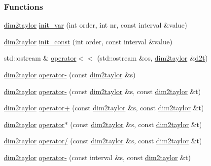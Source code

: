 \subsubsection*{\-Functions}
\begin{DoxyCompactItemize}
\item 
\hyperlink{classtaylor_1_1dim2taylor}{dim2taylor} \hyperlink{namespacetaylor_af8a36be36ab6bac844a69a3e14e2cc4d}{init\-\_\-var} (int order, int nr, const interval \&value)
\item 
\hyperlink{classtaylor_1_1dim2taylor}{dim2taylor} \hyperlink{namespacetaylor_a2d1667d3b5c500795eb06c586d75c309}{init\-\_\-const} (int order, const interval \&value)
\item 
std\-::ostream \& \hyperlink{namespacetaylor_a23cd9841df525cfac085fbeb62bf52a9}{operator$<$$<$} (std\-::ostream \&os, \hyperlink{classtaylor_1_1dim2taylor}{dim2taylor} \&\hyperlink{errorfunc_8hpp_ac90353a98ada0c22146b3ea9f0ac7a4d}{d2t})
\item 
\hyperlink{classtaylor_1_1dim2taylor}{dim2taylor} \hyperlink{namespacetaylor_a6e1382a183bbab0366f7d451aa1d34d3}{operator-\/} (const \hyperlink{classtaylor_1_1dim2taylor}{dim2taylor} \&s)
\item 
\hyperlink{classtaylor_1_1dim2taylor}{dim2taylor} \hyperlink{namespacetaylor_a729ed4a1540f3e481333c864233cd8ad}{operator-\/} (const \hyperlink{classtaylor_1_1dim2taylor}{dim2taylor} \&s, const \hyperlink{classtaylor_1_1dim2taylor}{dim2taylor} \&t)
\item 
\hyperlink{classtaylor_1_1dim2taylor}{dim2taylor} \hyperlink{namespacetaylor_a21e6c0930f861f85d9bdb26d9c413339}{operator+} (const \hyperlink{classtaylor_1_1dim2taylor}{dim2taylor} \&s, const \hyperlink{classtaylor_1_1dim2taylor}{dim2taylor} \&t)
\item 
\hyperlink{classtaylor_1_1dim2taylor}{dim2taylor} \hyperlink{namespacetaylor_a50aeb0816ed5baecbdd1bc3885a2fbb9}{operator$\ast$} (const \hyperlink{classtaylor_1_1dim2taylor}{dim2taylor} \&s, const \hyperlink{classtaylor_1_1dim2taylor}{dim2taylor} \&t)
\item 
\hyperlink{classtaylor_1_1dim2taylor}{dim2taylor} \hyperlink{namespacetaylor_a19fd6334248ac67ca9af590bf1eef26a}{operator/} (const \hyperlink{classtaylor_1_1dim2taylor}{dim2taylor} \&s, const \hyperlink{classtaylor_1_1dim2taylor}{dim2taylor} \&t)
\item 
\hyperlink{classtaylor_1_1dim2taylor}{dim2taylor} \hyperlink{namespacetaylor_a6d905ffff19d4d823f32782893096d4a}{operator-\/} (const interval \&s, const \hyperlink{classtaylor_1_1dim2taylor}{dim2taylor} \&t)

\end{DoxyCompactItemize}
